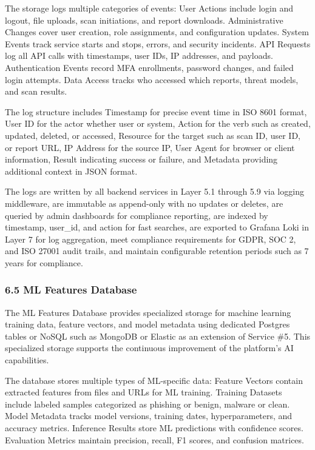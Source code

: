 \documentclass[12pt,a4paper]{report}
\begin{document}
The storage logs multiple categories of events: User Actions include login and logout, file uploads, scan initiations, and report downloads. Administrative Changes cover user creation, role assignments, and configuration updates. System Events track service starts and stops, errors, and security incidents. API Requests log all API calls with timestamps, user IDs, IP addresses, and payloads. Authentication Events record MFA enrollments, password changes, and failed login attempts. Data Access tracks who accessed which reports, threat models, and scan results.

The log structure includes Timestamp for precise event time in ISO 8601 format, User ID for the actor whether user or system, Action for the verb such as created, updated, deleted, or accessed, Resource for the target such as scan ID, user ID, or report URL, IP Address for the source IP, User Agent for browser or client information, Result indicating success or failure, and Metadata providing additional context in JSON format.

The logs are written by all backend services in Layer 5.1 through 5.9 via logging middleware, are immutable as append-only with no updates or deletes, are queried by admin dashboards for compliance reporting, are indexed by timestamp, user\_id, and action for fast searches, are exported to Grafana Loki in Layer 7 for log aggregation, meet compliance requirements for GDPR, SOC 2, and ISO 27001 audit trails, and maintain configurable retention periods such as 7 years for compliance.

\subsubsection{6.5 ML Features Database}

The ML Features Database provides specialized storage for machine learning training data, feature vectors, and model metadata using dedicated Postgres tables or NoSQL such as MongoDB or Elastic as an extension of Service \#5. This specialized storage supports the continuous improvement of the platform's AI capabilities.

The database stores multiple types of ML-specific data: Feature Vectors contain extracted features from files and URLs for ML training. Training Datasets include labeled samples categorized as phishing or benign, malware or clean. Model Metadata tracks model versions, training dates, hyperparameters, and accuracy metrics. Inference Results store ML predictions with confidence scores. Evaluation Metrics maintain precision, recall, F1 scores, and confusion matrices.
\end{document}
